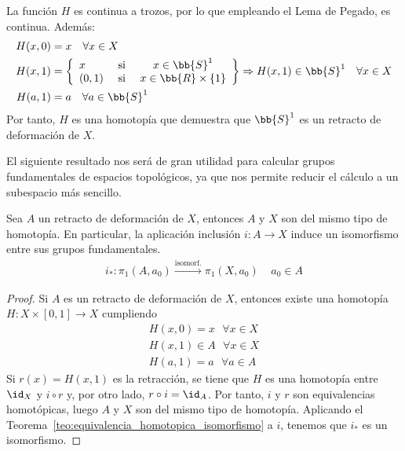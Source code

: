 \begin{ejemplo}
\begin{enumerate}
        La función $H$ es continua a trozos, por lo que empleando el Lema de Pegado, es continua. Además:
        \begin{align*}
            H(x,0) &= x \ \ \ \forall x \in X\\
            H(x,1) &=  \left\{
                \begin{array}{l c c }
                    x & \text{ si } & x\in \bb{S}^1\\
                    (0,1) & \text{ si } & x\in \bb{R}\times\{1\}
                \end{array}
            \right\} \Rightarrow H(x,1)\in \bb{S}^1 \ \ \ \forall x \in X\\
            H(a,1) &= a \ \ \ \forall a\in \bb{S}^1
        \end{align*}
        Por tanto, $H$ es una homotopía que demuestra que $\bb{S}^1$ es un retracto de deformación de $X$.

        
    \end{enumerate}
\end{ejemplo}

El siguiente resultado nos será de gran utilidad para calcular grupos fundamentales de espacios topológicos, ya que nos permite reducir el cálculo a un subespacio más sencillo.
\begin{coro}
    Sea $A$ un retracto de deformación de $X$, entonces $A$ y $X$ son del mismo tipo de homotopía. En particular, la aplicación inclusión $i:A\to X$ induce un isomorfismo entre sus grupos fundamentales.
    \begin{gather*}
        i_*:\pi_1(A,a_0) \overset{\text{isomorf.}}{\longrightarrow} \pi_1(X,a_0)\ \ \ \ \ a_0\in A
    \end{gather*}
    \begin{proof}
        Si $A$ es un retracto de deformación de $X$, entonces existe una homotopía $H:X\times[0,1]\to X$ cumpliendo
        \begin{gather*}
            H(x,0) = x \ \ \ \forall x \in X\\
            H(x,1) \in A \ \ \ \forall x \in X\\
            H(a,1) = a \ \ \ \forall a\in A
        \end{gather*}
        Si $r(x)=H(x,1)$ es la retracción, se tiene  que $H$ es una homotopía entre $\id_X$ y $i \circ r$ y, por otro lado, $r\circ i = \id_A$. Por tanto, $i$ y $r$ son equivalencias homotópicas, luego $A$ y $X$ son del mismo tipo de homotopía. Aplicando el Teorema~\ref{teo:equivalencia_homotopica_isomorfismo} a $i$, tenemos que $i_*$ es un isomorfismo.
    \end{proof}
\end{coro}

